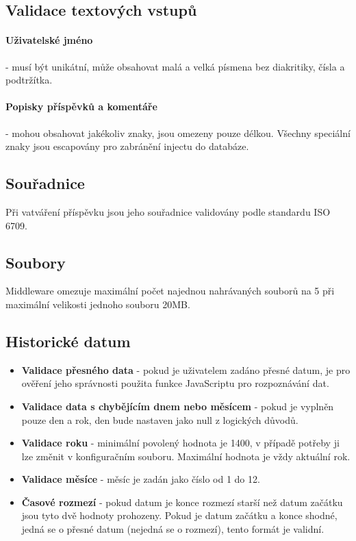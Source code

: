 \documentclass[12pt, a4paper,
 twoside,        %
 openright
]{report}
\begin{document}
\subsection{Validace textových vstupů}
\paragraph{Uživatelské jméno}\label{paragraph:username} - musí být unikátní, může obsahovat malá a velká písmena bez diakritiky, čísla a podtržítka.
\paragraph{Popisky příspěvků a komentáře} - mohou obsahovat jakékoliv znaky, jsou omezeny pouze délkou. Všechny speciální znaky jsou escapovány pro zabránění injectu do databáze.
\subsection{Souřadnice} Při vatváření příspěvku jsou jeho souřadnice validovány podle standardu ISO 6709.
\subsection{Soubory} Middleware omezuje maximální počet najednou nahrávaných souborů na 5 při maximální velikosti jednoho souboru 20MB.
\subsection{Historické datum}
    \begin{itemize}
        \item \textbf{Validace přesného data} - pokud je uživatelem zadáno přesné datum, je pro ověření jeho správnosti použita funkce JavaScriptu pro rozpoznávání dat.
        \item \textbf{Validace data s chybějícím dnem nebo měsícem} - pokud je vyplněn pouze den a rok, den bude nastaven jako null z logických důvodů. 
        \item \textbf{Validace roku} - minimální povolený hodnota je 1400, v případě potřeby ji lze změnit v konfiguračním souboru. Maximální hodnota je vždy aktuální rok.        
        \item \textbf{Validace měsíce} - měsíc je zadán jako číslo od 1 do 12.
        \item \textbf{Časové rozmezí} - pokud datum je konce rozmezí starší než datum začátku jsou tyto dvě hodnoty prohozeny. Pokud je datum začátku a konce shodné, jedná se o přesné datum (nejedná se o rozmezí), tento formát je validní.
    \end{itemize}
\end{document}
